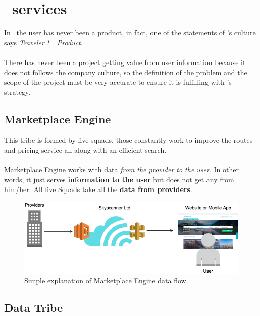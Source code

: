 
\section{\company\ services}

In \company\ the user has never been a product, in fact, one of the statements of \company's culture says \textit{Traveler != Product}\cite{the_road_ahead}.
\\\\
There has never been a project getting value from user information because it does not follows the company culture, so the definition of the problem and the scope of the project must be very accurate to ensure it is fulfilling with \company's strategy\cite{skyscanner_strategy}.

\subsection{Marketplace Engine} \label{mp_engine}

This tribe is formed by five squads, those constantly work to improve the routes and pricing service all along with an efficient search.
\\\\
Marketplace Engine works with data \textit{from the provider to the user}. In other words, it just serves \textbf{information to the user} but does not get any from him/her. All five Squads take all the \textbf{data from providers}.

\begin{figure}[H]
\centering
\includegraphics[scale=0.45]{diagrams/state-of-the-art-tribes-mp.png}
\caption{Simple explanation of Marketplace Engine data flow.}
\end{figure}

\subsection{Data Tribe} \label{data_tribe}

